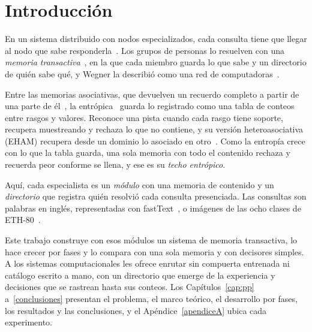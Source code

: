 \chapter*{Introducción}\label{introduccion}\label{sec:introduccion}
\thispagestyle{empty}
En un sistema distribuido con nodos especializados, cada consulta tiene que llegar al
nodo que sabe responderla~\cite{crespo2002routing,callan2000distributed}.
Los grupos de personas lo resuelven con una \emph{memoria
transactiva}~\cite{wegner1987transactive}, en la que cada miembro guarda lo que sabe y un
directorio de quién sabe qué, y Wegner la describió como una red de
computadoras~\cite{wegner1995computer}.

Entre las memorias asociativas, que devuelven un recuerdo completo a partir de una parte
de él~\cite{hopfield1982neural}, la entrópica~\cite{pineda2021entropic,pineda2022weighted}
guarda lo registrado como una tabla de conteos entre rasgos y valores.
Reconoce una pista cuando cada rasgo tiene soporte, recupera muestreando y rechaza lo que
no contiene, y su versión heteroasociativa (EHAM) recupera desde un dominio lo asociado en
otro~\cite{morales2025missing}.
Como la entropía crece con lo que la tabla guarda, una sola memoria con todo el contenido
rechaza y recuerda peor conforme se llena, y ese es su \emph{techo entrópico}.

Aquí, cada especialista es un \emph{módulo} con una memoria de contenido y un
\emph{directorio} que registra quién resolvió cada consulta presenciada.
Las consultas son palabras en inglés, representadas con
fastText~\cite{bojanowski2017fasttext}, o imágenes de las ocho clases de
ETH-80~\cite{leibe2003eth80}.

Este trabajo construye con esos módulos un sistema de memoria transactiva, lo hace crecer
por fases y lo compara con una sola memoria y con decisores simples.
A los sistemas computacionales les ofrece enrutar sin compuerta entrenada ni catálogo
escrito a mano, con un directorio que emerge de la experiencia y decisiones que se
rastrean hasta sus conteos.
Los Capítulos~\ref{cap:pp} a~\ref{conclusiones} presentan el problema, el marco teórico,
el desarrollo por fases, los resultados y las conclusiones, y el Apéndice~\ref{apendiceA}
ubica cada experimento.
